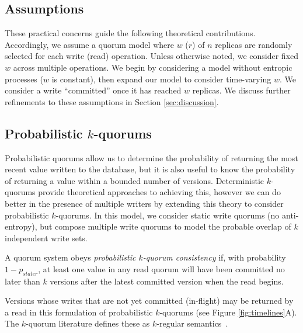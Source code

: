 \documentclass{vldb}
\begin{document}
\subsection{Assumptions}

These practical concerns guide the following theoretical
contributions.  Accordingly, we assume a quorum model where $w$ ($r$)
of $n$ replicas are randomly selected for each write (read) operation.
Unless otherwise noted, we consider fixed $w$ across multiple
operations.  We begin by considering a model without entropic
processes ($w$ is constant), then expand our model to consider
time-varying $w$. We consider a write ``committed'' once it has
reached $w$ replicas. We discuss further refinements to these
assumptions in Section \ref{sec:discussion}.

\subsection{Probabilistic $k$-quorums}

Probabilistic quorums allow us to determine the probability of
returning the most recent value written to the database, but it is
also useful to know the probability of returning a value within a
bounded number of versions.  Deterministic $k$-quorums provide
theoretical approaches to achieving this, however we can do better in
the presence of multiple writers by extending this theory to consider
probabilistic $k$-quorums.  In this model, we consider static write
quorums (no anti-entropy), but compose multiple write quorums to model the probable overlap of $k$ independent write sets.
\begin{definition}
A quorum system obeys \textit{probabilistic $k$-quorum consistency} if, with
probability $1-p_{staler}$, at least one value in any read quorum will
have been committed no later than $k$ versions after the latest committed
version when the read begins.
\end{definition}
Versions whose writes that are not yet committed (in-flight) may be
returned by a read in this formulation of probabilistic $k$-quorums
(see Figure \ref{fig:timelines}A).  The $k$-quorum literature defines these as $k$-regular semantics~\cite{nonstrict-availability}.
\end{document}
